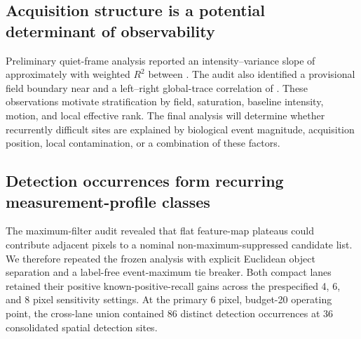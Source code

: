 
\subsection{Acquisition structure is a potential determinant of observability}

Preliminary quiet-frame analysis reported an intensity--variance slope of approximately \QuietVarianceSlope{} with weighted $R^2$ between \QuietVarianceWeightedRtwo{}. The audit also identified a provisional field boundary near \ProvisionalFieldBoundaryX{} and a left--right global-trace correlation of \LeftRightGlobalCorrelation{}. These observations motivate stratification by field, saturation, baseline intensity, motion, and local effective rank. The final analysis will determine whether recurrently difficult sites are explained by biological event magnitude, acquisition position, local contamination, or a combination of these factors.


\subsection{Detection occurrences form recurring measurement-profile classes}

The maximum-filter audit revealed that flat feature-map plateaus could contribute adjacent pixels to a nominal non-maximum-suppressed candidate list. We therefore repeated the frozen analysis with explicit Euclidean object separation and a label-free event-maximum tie breaker. Both compact lanes retained their positive known-positive-recall gains across the prespecified 4, 6, and 8 pixel sensitivity settings. At the primary 6 pixel, budget-20 operating point, the cross-lane union contained 86 distinct detection occurrences at 36 consolidated spatial detection sites.

